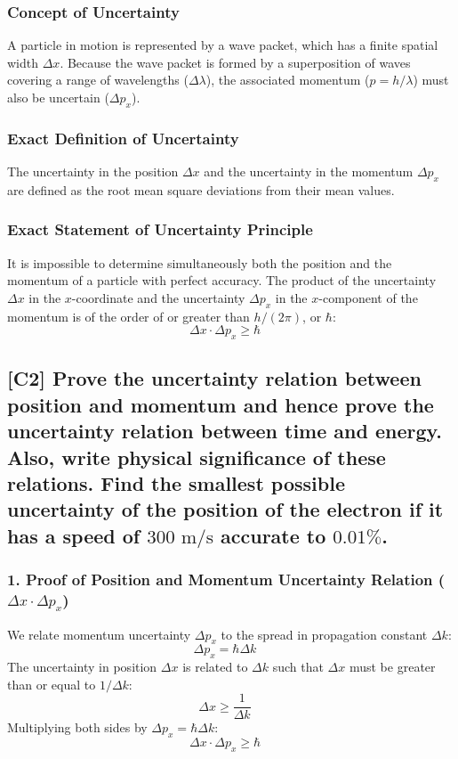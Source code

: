 \documentclass[12pt]{article}
\begin{document}
\subsubsection*{Concept of Uncertainty}
A particle in motion is represented by a wave packet, which has a finite spatial width $\Delta x$. Because the wave packet is formed by a superposition of waves covering a range of wavelengths ($\Delta \lambda$), the associated momentum ($p=h/\lambda$) must also be uncertain ($\Delta p_x$).

\subsubsection*{Exact Definition of Uncertainty}
The uncertainty in the position $\Delta x$ and the uncertainty in the momentum $\Delta p_x$ are defined as the root mean square deviations from their mean values.

\subsubsection*{Exact Statement of Uncertainty Principle}
It is impossible to determine simultaneously both the position and the momentum of a particle with perfect accuracy. The product of the uncertainty $\Delta x$ in the $x$-coordinate and the uncertainty $\Delta p_x$ in the $x$-component of the momentum is of the order of or greater than $h/(2\pi)$, or $\hbar$:
$$
\Delta x \cdot \Delta p_x \geq \hbar \quad \text{}
$$

\subsection{[C2] Prove the uncertainty relation between position and momentum and hence prove the uncertainty relation between time and energy. Also, write physical significance of these relations. Find the smallest possible uncertainty of the position of the electron if it has a speed of $300 \text{ m/s}$ accurate to $0.01\%$.}

\subsubsection*{1. Proof of Position and Momentum Uncertainty Relation ($\Delta x \cdot \Delta p_x$)}
We relate momentum uncertainty $\Delta p_x$ to the spread in propagation constant $\Delta k$:
$$
\Delta p_x = \hbar \Delta k \quad \text{}
$$
The uncertainty in position $\Delta x$ is related to $\Delta k$ such that $\Delta x$ must be greater than or equal to $1/\Delta k$:
$$
\Delta x \geq \frac{1}{\Delta k} \quad \text{}
$$
Multiplying both sides by $\Delta p_x = \hbar \Delta k$:
$$
\Delta x \cdot \Delta p_x \geq \hbar \quad \text{}
$$
\end{document}
